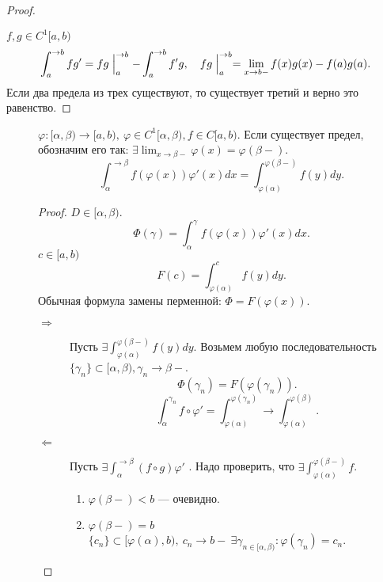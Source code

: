 \begin{prop}
\begin{proof}
\begin{defn}
	\end{defn}
	$ f, g \in  C^{1}[a, b)$
	\[
	    \int_{a}^{ \to b} f g' = fg \Bigm|_a^{ \to  b} - \int_{a}^{ \to b}  f' g, \quad fg \Bigm|_a^{ \to b} = \lim_{x \to b-} f(x) g(x) - f(a)g(a)
	.\]
	Если два предела из трех существуют, то существует третий и верно это равенство.
    \end{proof}
    \begin{description}
\item []
    $ \varphi : [ \alpha , \beta ) \to [a, b) , ~ \varphi  \in C^{1}[ \alpha , \beta ), f \in C[a, b)$. Если существует предел, обозначим его так: $ \exists \lim_{x \to  \beta -}  \varphi (x) = \varphi ( \beta -)$.
    \[
	\int_{ \alpha }^{ \to \beta } f( \varphi (x)) \varphi '(x) dx = \int_{ \varphi ( \alpha ) }^{ \varphi (\beta -)} f(y) dy
    .\]
    \begin{proof}
	$ D \in [ \alpha , \beta )$. \[
	    \Phi (\gamma) = \int_{ \alpha}^{\gamma}  f( \varphi (x)) \varphi '(x) dx
	.\]
	$ c \in  [a, b)$
	\[
	    F(c) =\int_{ \varphi (\alpha)}^{c } f(y) dy
	.\]
	Обычная формула замены перменной: $ \Phi = F( \varphi (x))$.
	\begin{description}
	    \item [$\boxed{ \Longrightarrow }$]  Пусть $ \exists  \int_{ \varphi ( \alpha )}^{ \varphi (\beta-)}  f(y) dy$. Возьмем любую последовательность $ \{ \gamma_n \} \subset [ \alpha , \beta ),  \gamma _n \to  \beta  -$.
		\[
		    \Phi(\gamma_n) = F( \varphi (\gamma_n))
		.\]
		\[
		    \int_{ \alpha }^{ \gamma_n} f \circ \varphi ' = \int_{ \varphi ( \alpha )}^{ \varphi (\gamma_n)} \to \int_{\varphi(\alpha)}^{\varphi(\beta)}
		.\]
	    \item [$\boxed{ \Longleftarrow }$]  Пусть $ \exists \int_{\alpha}^{ \to \beta }(f \circ g) \varphi '  $
		. Надо проверить, что $ \exists  \int_{ \varphi ( \alpha )}^{ \varphi (\beta -)} f $.
		\begin{enumerate}
		    \item $ \varphi (\beta-) < b$ --- очевидно.
		    \item $ \varphi (\beta -) = b$
			$ \{ c_n \} \subset [ \varphi ( \alpha ), b) ,  ~ c_n \to  b- ~ \exists \gamma_{n \in[ \alpha , \beta )}: \varphi ( \gamma_n) = c_n$.


\end{enumerate}
\end{description}
\end{proof}
\end{description}
\end{prop}
